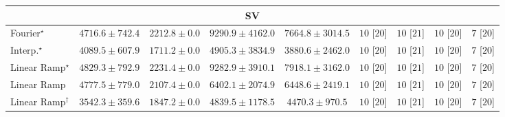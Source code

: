 \begin{tabular}{l|cccc|cccc|}
\cline{1-9}
\multicolumn{9}{c}{\rule{0pt}{8pt}SV} \\
\midrule
Fourier$^\star$ & {\cellcolor[HTML]{9EBAD9}} \color[HTML]{000000} $4716.6\pm 742.4$ & {\cellcolor[HTML]{F5EFF6}} \color[HTML]{000000} $2212.8\pm 0.0$ & {\cellcolor[HTML]{023858}} \color[HTML]{F1F1F1} $9290.9\pm 4162.0$ & {\cellcolor[HTML]{0569A5}} \color[HTML]{F1F1F1} $7664.8\pm 3014.5$ & {\cellcolor[HTML]{49006A}} \color[HTML]{F1F1F1} $10$ [$20$] & {\cellcolor[HTML]{49006A}} \color[HTML]{F1F1F1} $10$ [$21$] & {\cellcolor[HTML]{49006A}} \color[HTML]{F1F1F1} $10$ [$20$] & {\cellcolor[HTML]{FFF7F3}} \color[HTML]{000000} $7$ [$20$] \\
Interp.$^\star$ & {\cellcolor[HTML]{BBC7E0}} \color[HTML]{000000} $4089.5\pm 607.9$ & {\cellcolor[HTML]{FFF7FB}} \color[HTML]{000000} $1711.2\pm 0.0$ & {\cellcolor[HTML]{94B6D7}} \color[HTML]{000000} $4905.3\pm 3834.9$ & {\cellcolor[HTML]{C4CBE3}} \color[HTML]{000000} $3880.6\pm 2462.0$ & {\cellcolor[HTML]{49006A}} \color[HTML]{F1F1F1} $10$ [$20$] & {\cellcolor[HTML]{49006A}} \color[HTML]{F1F1F1} $10$ [$21$] & {\cellcolor[HTML]{49006A}} \color[HTML]{F1F1F1} $10$ [$20$] & {\cellcolor[HTML]{FFF7F3}} \color[HTML]{000000} $7$ [$20$] \\
Linear Ramp$^\star$ & {\cellcolor[HTML]{97B7D7}} \color[HTML]{000000} $4829.3\pm 792.9$ & {\cellcolor[HTML]{F5EEF6}} \color[HTML]{000000} $2231.4\pm 0.0$ & {\cellcolor[HTML]{023858}} \color[HTML]{F1F1F1} $9282.9\pm 3910.1$ & {\cellcolor[HTML]{04649D}} \color[HTML]{F1F1F1} $7918.1\pm 3162.0$ & {\cellcolor[HTML]{49006A}} \color[HTML]{F1F1F1} $10$ [$20$] & {\cellcolor[HTML]{49006A}} \color[HTML]{F1F1F1} $10$ [$21$] & {\cellcolor[HTML]{49006A}} \color[HTML]{F1F1F1} $10$ [$20$] & {\cellcolor[HTML]{FFF7F3}} \color[HTML]{000000} $7$ [$20$] \\
Linear Ramp & {\cellcolor[HTML]{9AB8D8}} \color[HTML]{000000} $4777.5\pm 779.0$ & {\cellcolor[HTML]{F7F0F7}} \color[HTML]{000000} $2107.4\pm 0.0$ & {\cellcolor[HTML]{3991C1}} \color[HTML]{F1F1F1} $6402.1\pm 2074.9$ & {\cellcolor[HTML]{358FC0}} \color[HTML]{F1F1F1} $6448.6\pm 2419.1$ & {\cellcolor[HTML]{49006A}} \color[HTML]{F1F1F1} $10$ [$20$] & {\cellcolor[HTML]{49006A}} \color[HTML]{F1F1F1} $10$ [$21$] & {\cellcolor[HTML]{49006A}} \color[HTML]{F1F1F1} $10$ [$20$] & {\cellcolor[HTML]{FFF7F3}} \color[HTML]{000000} $7$ [$20$] \\
Linear Ramp$^\dagger$ & {\cellcolor[HTML]{D2D3E7}} \color[HTML]{000000} $3542.3\pm 359.6$ & {\cellcolor[HTML]{FDF5FA}} \color[HTML]{000000} $1847.2\pm 0.0$ & {\cellcolor[HTML]{97B7D7}} \color[HTML]{000000} $4839.5\pm 1178.5$ & {\cellcolor[HTML]{A9BFDC}} \color[HTML]{000000} $4470.3\pm 970.5$ & {\cellcolor[HTML]{49006A}} \color[HTML]{F1F1F1} $10$ [$20$] & {\cellcolor[HTML]{49006A}} \color[HTML]{F1F1F1} $10$ [$21$] & {\cellcolor[HTML]{49006A}} \color[HTML]{F1F1F1} $10$ [$20$] & {\cellcolor[HTML]{FFF7F3}} \color[HTML]{000000} $7$ [$20$] \\

\end{tabular}

